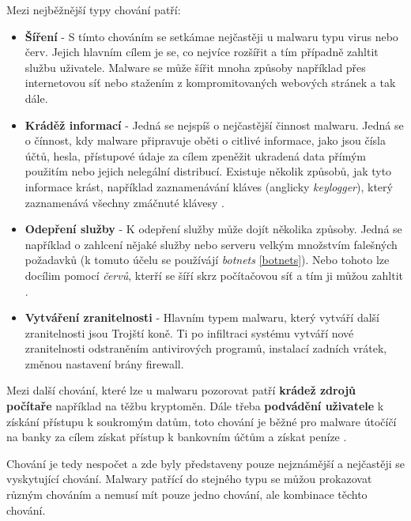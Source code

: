 Mezi nejběžnější typy chování patří: \cite{article_malware}
\begin{itemize}
    \item \textbf{Šíření} - S tímto chováním se setkámae nejčastěji u malwaru typu virus nebo červ. Jejich hlavním cílem je se, co nejvíce rozšířit a tím případně zahltit službu uživatele. Malware se může šířit mnoha způsoby například přes internetovou síť nebo stažením z kompromitovaných webových stránek a tak dále.
    \item \textbf{Kráděž informací} - Jedná se nejspíš o nejčastější činnost malwaru. Jedná se o čínnost, kdy malware připravuje oběti o citlivé informace, jako jsou čísla účtů, hesla, přístupové údaje za cílem zpeněžit ukradená data přímým použitím nebo jejich nelegální distribucí. Existuje několik způsobů, jak tyto informace krást, například zaznamenávání kláves (anglicky \textit{keylogger}), který zaznamenává všechny zmáčnuté klávesy \cite{data_stealing}.
    \item \textbf{Odepření služby} - K odepření služby může dojít několika způsoby. Jedná se například o zahlcení nějaké služby nebo serveru velkým množstvím falešných požadavků (k tomuto účelu se používájí \textit{botnets} \ref{botnets}). Nebo tohoto lze docílim pomocí \textit{červů}, kterří se šíří skrz počítačovou síť a tím ji můžou zahltit \cite{dos}.
    \item \textbf{Vytváření zranitelnosti} - Hlavním typem malwaru, který vytváří další zranitelnosti jsou Trojští koně. Ti po infiltraci systému vytváří nové zranitelnosti odstraněním antivirových programů, instalací zadních vrátek, změnou nastavení brány firewall.
\end{itemize}

Mezi další chování, které lze u malwaru pozorovat patří \textbf{krádež zdrojů počítaře} například na těžbu kryptoměn. Dále třeba \textbf{podvádění uživatele} k získání přístupu k soukromým datům, toto chování je běžné pro malware útočíčí na banky za cílem získat přístup k bankovním účtům a získat peníze \cite{article_malware}.

Chování je tedy nespočet a zde byly představeny pouze nejznámější a nejčastěji se vyskytující chování. Malwary patřící do stejného typu se můžou prokazovat různým chováním a nemusí mít pouze jedno chování, ale kombinace těchto chování.
